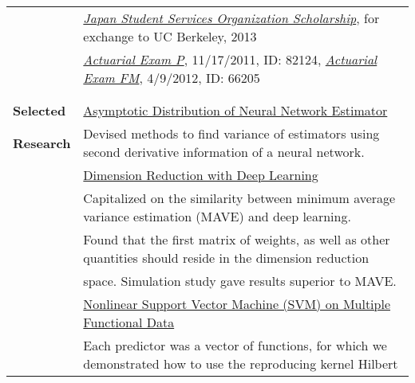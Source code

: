 \documentclass[utf8,letterpaper,oneside]{article}
\begin{document}
\begin{center}
\begin{tabular}{l l}
                           & \underline{{\textit{Japan Student Services Organization Scholarship}}}, for exchange to UC Berkeley, 2013                                        \\
                           & \underline{\textit{Actuarial Exam P}}, 11/17/2011, ID: 82124, \underline{\textit{Actuarial Exam FM}}, 4/9/2012, ID: 66205                        \\
                           &                                                                                                                                                  \\ \hline
                           &                                                                                                                                                  \\
  \textbf{Selected}        & \underline{Asymptotic Distribution of Neural Network Estimator}                                                                                  \\
  \textbf{Research}        & Devised methods to find variance of estimators using second derivative information of a neural network.                                             \\
                           & \underline{Dimension Reduction with Deep Learning}                                                                                               \\
                           & Capitalized on the similarity between minimum average variance estimation (MAVE) and deep learning.                                              \\
                           & Found that the first matrix of weights, as well as other quantities should reside in the dimension reduction                                     \\
                           & space. Simulation study gave results superior to MAVE.                                                                                           \\
                           & \underline{Nonlinear Support Vector Machine (SVM) on Multiple Functional Data}                                                                   \\
                           & Each predictor was a vector of functions, for which we demonstrated how to use the reproducing kernel Hilbert                                    \\

\end{tabular}
\end{center}
\end{document}
